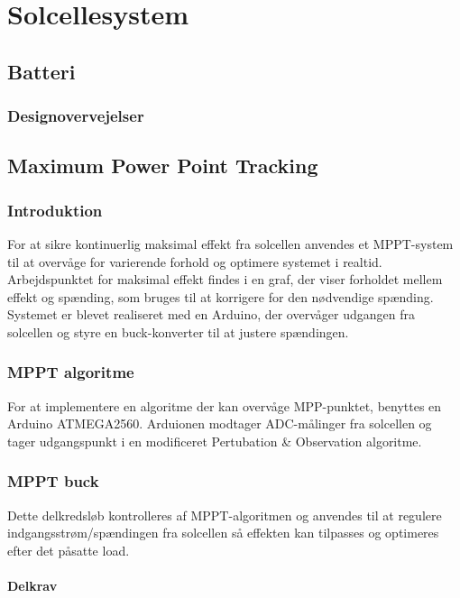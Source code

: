 \documentclass[../main.tex]{subfiles}
\begin{document}
\chapter{Solcellesystem} \label{Chap:Solcellesystem}

\section{Batteri}

    \subsection{Designovervejelser}

\section{Maximum Power Point Tracking}

    \subsection{Introduktion}

For at sikre kontinuerlig maksimal effekt fra solcellen anvendes et MPPT-system til at overvåge for varierende forhold og optimere systemet i realtid. Arbejdspunktet for maksimal effekt findes i en graf, der viser forholdet mellem effekt og spænding, som bruges til at korrigere for den nødvendige spænding. Systemet er blevet realiseret med en Arduino, der overvåger udgangen fra solcellen og styre en buck-konverter til at justere spændingen.

    \subsection{MPPT algoritme}
    
    For at implementere en algoritme der kan overvåge MPP-punktet, benyttes en Arduino ATMEGA2560. Arduionen modtager ADC-målinger fra solcellen og tager udgangspunkt i en modificeret Pertubation & Observation algoritme. 


    \subsection{MPPT buck}
        Dette delkredsløb kontrolleres af MPPT-algoritmen og anvendes til at regulere indgangsstrøm/spændingen fra solcellen så effekten kan tilpasses og optimeres efter det påsatte load.
        
        \subsubsection{Delkrav}
\end{document}
